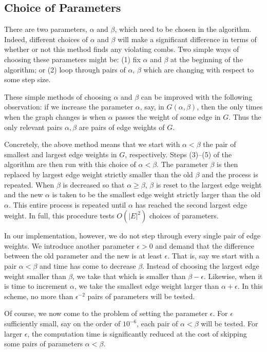 \documentclass[11pt, letterpaper]{amsart}
\theoremstyle{plain}
\theoremstyle{definition}
\theoremstyle{remark}
\begin{document}
\subsection{Choice of Parameters}
There are two parameters, $\alpha$ and $\beta$, which need to be chosen in the
algorithm. Indeed, different choices of $\alpha$ and $\beta$ will make a
significant difference in terms of whether or not this method finds any
violating combs. Two simple ways of choosing these parameters might be: (1)
fix $\alpha$ and $\beta$ at the beginning of the algorithm; or (2) loop through
pairs of $\alpha$, $\beta$ which are changing with respect to some step size.

These simple methods of choosing $\alpha$ and $\beta$ can be improved with the
following observation: if we increase the parameter $\alpha$, say, in
$G(\alpha,\beta)$, then the only times when the graph changes is when $\alpha$
passes the weight of some edge in $G$. Thus the only relevant pairs
$\alpha,\beta$ are pairs of edge weights of $G$.

Concretely, the above method means that we start with $\alpha < \beta$ the pair
of smallest and largest edge weights in $G$, respectively. Steps (3)--(5) of
the algorithm are then run with this choice of $\alpha < \beta$. The parameter
$\beta$ is then replaced by largest edge weight strictly smaller than the old
$\beta$ and the process is repeated. When $\beta$ is decreased so that $\alpha
\geq \beta$, $\beta$ is reset to the largest edge weight and the new $\alpha$
is taken to be the smallest edge weight strictly larger than the old $\alpha$.
This entire process is repeated until $\alpha$ has reached the second largest
edge weight. In full, this procedure tests $O(|E|^2)$ choices of parameters.

In our implementation, however, we do not step through every single pair of
edge weights. We introduce another parameter $\epsilon > 0$ and demand that the
difference between the old parameter and the new is at least $\epsilon$. That
is, say we start with a pair $\alpha < \beta$ and time has come to decrease
$\beta$. Instead of choosing the largest edge weight smaller than $\beta$, we
take that which is smaller than $\beta - \epsilon$. Likewise, when it is time
to increment $\alpha$, we take the smallest edge weight larger than $\alpha +
\epsilon$. In this scheme, no more than $\epsilon^{-2}$ pairs of parameters
will be tested.

Of course, we now come to the problem of setting the parameter $\epsilon$. For
$\epsilon$ sufficiently small, say on the order of $10^{-6}$, each pair of
$\alpha < \beta$ will be tested. For larger $\epsilon$, the computation time is
significantly reduced at the cost of skipping some pairs of parameters $\alpha
< \beta$.
\end{document}
